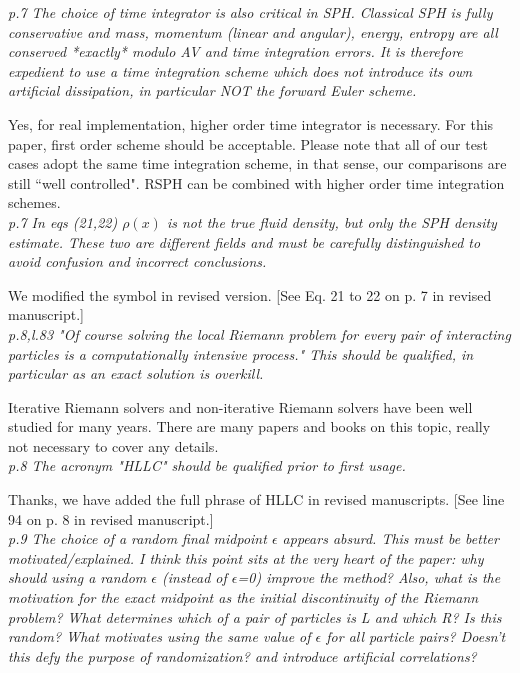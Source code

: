 \documentclass[10pt,a4paper]{article}
\begin{document}
\textit{p.7 The choice of time integrator is also critical in SPH. Classical SPH is fully conservative and mass, momentum (linear and angular), energy, entropy are all conserved *exactly* modulo AV and time integration errors. It is therefore expedient to use a time integration scheme which does not introduce its own artificial dissipation, in particular NOT the forward Euler scheme.}

Yes, for real implementation, higher order time integrator is necessary. For this paper, first order scheme should be acceptable. Please note that all of our test cases adopt the same time integration scheme, in that sense, our comparisons are still ``well controlled". RSPH can be combined with higher order time integration schemes.
\\[3pt]

\textit{p.7 In eqs (21,22) $\rho(x)$ is not the true fluid density, but only the SPH density estimate. These two are different fields and must be carefully distinguished to avoid confusion and incorrect conclusions.}

We modified the symbol in revised version. [See Eq. 21 to 22 on p. 7 in revised manuscript.]
\\[3pt]

\textit{p.8,l.83 "Of course solving the local Riemann problem for every pair of interacting particles is a computationally intensive process." This should be qualified, in particular as an exact solution is overkill.}

Iterative Riemann solvers and non-iterative Riemann solvers have been well studied for many years. There are many papers \citep[][e.g.]{roe1981approximate} and books \citep[][e.g.]{toro2013riemann} on this topic, really not necessary to cover any details.
\\[3pt]

\textit{p.8 The acronym "HLLC" should be qualified prior to first usage.}

Thanks, we have added the full phrase of HLLC in revised manuscripts.
[See line 94 on p. 8 in revised manuscript.]
\\[3pt]

\textit{p.9 The choice of a random final midpoint $\epsilon$ appears absurd. This must be better motivated/explained. I think this point sits at the very heart of the paper: why should using a random $\epsilon$ (instead of $\epsilon$=0) improve the method?
Also, what is the motivation for the exact midpoint as the initial discontinuity of the Riemann problem? What determines which of a pair of particles is L and which R? Is this random? What motivates using the same value of $\epsilon$ for all particle pairs? Doesn't this defy the purpose of randomization? and introduce artificial correlations?}
\end{document}
